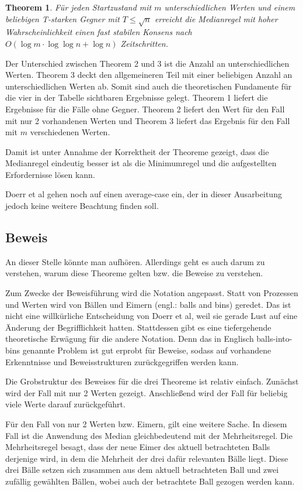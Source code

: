 \documentclass[12pt,ngerman,a4paper]{scrartcl}
\theoremstyle{plain}
\newtheorem{theorem}{Theorem}
\theoremstyle{definition}
\theoremstyle{remark}
\begin{document}
\begin{theorem}
Für jeden Startzustand mit $m$ unterschiedlichen Werten und einem beliebigen
T-starken Gegner mit $T \leq \sqrt{n}$ erreicht die Medianregel mit hoher
Wahrscheinlichkeit einen fast stabilen Konsens nach
$O(\log m \cdot \log \log n + \log n)$ Zeitschritten.
\end{theorem}

Der Unterschied zwischen Theorem 2 und 3 ist die Anzahl an unterschiedlichen
Werten. Theorem 3 deckt den allgemeineren Teil mit einer beliebigen Anzahl an
unterschiedlichen Werten ab. Somit sind auch die theoretischen Fundamente für
die vier in der Tabelle sichtbaren Ergebnisse gelegt. Theorem 1 liefert die
Ergebnisse für die Fälle ohne Gegner. Theorem 2 liefert den Wert für den Fall
mit nur 2 vorhandenen Werten und Theorem 3 liefert das Ergebnis für den Fall
mit $m$ verschiedenen Werten.

Damit ist unter Annahme der Korrektheit der Theoreme gezeigt, dass die Medianregel
eindeutig besser ist als die Minimumregel und die aufgestellten Erfordernisse
lösen kann.

Doerr et al gehen noch auf einen average-case ein, der in dieser Ausarbeitung
jedoch keine weitere Beachtung finden soll.

\subsection{Beweis}

An dieser Stelle könnte man aufhören. Allerdings geht es auch darum zu verstehen,
warum diese Theoreme gelten bzw. die Beweise zu verstehen.

Zum Zwecke der Beweisführung wird die Notation angepasst. Statt von Prozessen
und Werten wird von Bällen und Eimern (engl.: balls and bins) geredet. Das ist
nicht eine willkürliche Entscheidung von Doerr et al, weil sie gerade Lust auf
eine Änderung der Begrifflichkeit hatten. Stattdessen gibt es eine tiefergehende
theoretische Erwägung für die andere Notation. Denn das in Englisch balls-into-bins
genannte Problem ist gut erprobt für Beweise, sodass auf vorhandene Erkenntnisse
und Beweisstrukturen zurückgegriffen werden kann.

Die Grobstruktur des Beweises für die drei Theoreme ist relativ einfach.
Zunächst wird der Fall mit nur 2 Werten gezeigt. Anschließend wird der Fall für
beliebig viele Werte darauf zurückgeführt.

Für den Fall von nur 2 Werten bzw. Eimern, gilt eine weitere Sache. In diesem
Fall ist die Anwendung des Median gleichbedeutend mit der Mehrheitsregel. Die
Mehrheitsregel besagt, dass der neue Eimer des aktuell betrachteten Balls derjenige
wird, in dem die Mehrheit der drei dafür relevanten Bälle liegt. Diese drei Bälle
setzen sich zusammen aus dem aktuell betrachteten Ball und zwei zufällig gewählten
Bällen, wobei auch der betrachtete Ball gezogen werden kann.
\end{document}
